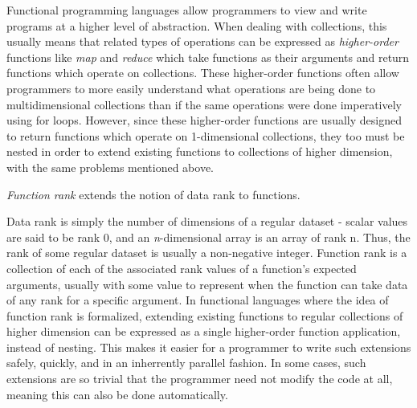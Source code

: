Functional programming languages allow programmers to view and write programs at a higher level of abstraction.
When dealing with collections, this usually means that related types of operations can be expressed as \textit{higher-order} functions like \textit{map} and \textit{reduce} which take functions as their arguments and return functions which operate on collections.
These higher-order functions often allow programmers to more easily understand what operations are being done to multidimensional collections than if the same operations were done imperatively using for loops.
However, since these higher-order functions are usually designed to return functions which operate on 1-dimensional collections, they too must be nested in order to extend existing functions to collections of higher dimension, with the same problems mentioned above.

\textit{Function rank} extends the notion of data rank to functions.\begin{comment}TODO cite\end{comment}
Data rank is simply the number of dimensions of a regular dataset - scalar values are said to be rank 0, and an \textit{n}-dimensional array is an array of rank n.
Thus, the rank of some regular dataset is usually a non-negative integer.
Function rank is a collection of each of the associated rank values of a function's expected arguments, usually with some value to represent when the function can take data of any rank for a specific argument.
In functional languages where the idea of function rank is formalized, extending existing functions to regular collections of higher dimension can be expressed as a single higher-order function application, instead of nesting.
This makes it easier for a programmer to write such extensions safely, quickly, and in an inherrently parallel fashion.
In some cases, such extensions are so trivial that the programmer need not modify the code at all, meaning this can also be done automatically.


